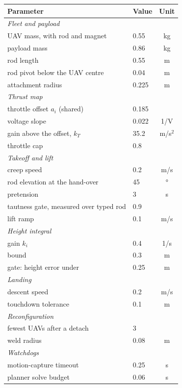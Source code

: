 \begin{tabular}{llc}
\toprule
Parameter & Value & Unit \\
\midrule
\multicolumn{3}{l}{\textit{Fleet and payload}} \\
\quad UAV mass, with rod and magnet & 0.55 & kg \\
\quad payload mass & 0.86 & kg \\
\quad rod length & 0.55 & m \\
\quad rod pivot below the UAV centre & 0.04 & m \\
\quad attachment radius & 0.225 & m \\
\multicolumn{3}{l}{\textit{Thrust map}} \\
\quad throttle offset $a_i$ (shared) & 0.185 &  \\
\quad voltage slope & 0.022 & 1/V \\
\quad gain above the offset, $k_T$ & 35.2 & m/s$^2$ \\
\quad throttle cap & 0.8 &  \\
\multicolumn{3}{l}{\textit{Takeoff and lift}} \\
\quad creep speed & 0.2 & m/s \\
\quad rod elevation at the hand-over & 45 & \si{\degree} \\
\quad pretension & 3 & s \\
\quad tautness gate, measured over typed rod & 0.9 &  \\
\quad lift ramp & 0.1 & m/s \\
\multicolumn{3}{l}{\textit{Height integral}} \\
\quad gain $k_i$ & 0.4 & 1/s \\
\quad bound & 0.3 & m \\
\quad gate: height error under & 0.25 & m \\
\multicolumn{3}{l}{\textit{Landing}} \\
\quad descent speed & 0.2 & m/s \\
\quad touchdown tolerance & 0.1 & m \\
\multicolumn{3}{l}{\textit{Reconfiguration}} \\
\quad fewest UAVs after a detach & 3 &  \\
\quad weld radius & 0.08 & m \\
\multicolumn{3}{l}{\textit{Watchdogs}} \\
\quad motion-capture timeout & 0.25 & s \\
\quad planner solve budget & 0.06 & s \\
\bottomrule
\end{tabular}
